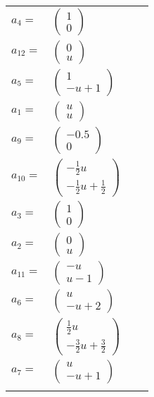 \documentclass[1p]{elsarticle_modified}
\theoremstyle{definition}
\begin{document}
\begin{tabular}{m{7pt} m{180pt} m{7pt} m{180pt} }
\flushright $a_{4}=$&$\begin{pmatrix}1\\0\end{pmatrix}$ \\
\flushright $a_{12}=$&$\begin{pmatrix}0\\u\end{pmatrix}$ \\
\flushright $a_{5}=$&$\begin{pmatrix}1\\- u+1\end{pmatrix}$ \\
\flushright $a_{1}=$&$\begin{pmatrix}u\\u\end{pmatrix}$ \\
\flushright $a_{9}=$&$\begin{pmatrix}-0.5\\0\end{pmatrix}$ \\
\flushright $a_{10}=$&$\begin{pmatrix}-\frac{1}{2} u\\-\frac{1}{2} u+\frac{1}{2}\end{pmatrix}$ \\
\flushright $a_{3}=$&$\begin{pmatrix}1\\0\end{pmatrix}$ \\
\flushright $a_{2}=$&$\begin{pmatrix}0\\u\end{pmatrix}$ \\
\flushright $a_{11}=$&$\begin{pmatrix}- u\\u-1\end{pmatrix}$ \\
\flushright $a_{6}=$&$\begin{pmatrix}u\\- u+2\end{pmatrix}$ \\
\flushright $a_{8}=$&$\begin{pmatrix}\frac{1}{2} u\\-\frac{3}{2} u+\frac{3}{2}\end{pmatrix}$ \\
\flushright $a_{7}=$&$\begin{pmatrix}u\\- u+1\end{pmatrix}$\\&\end{tabular}
\end{document}
